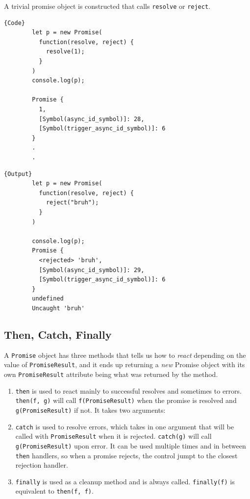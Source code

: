\documentclass{article}
\newcounter{example}[section]
\begin{document}
    \begin{example}
      \label{ex:resolve-without-asynchronous-functions}
      A trivial promise object is constructed that calls \texttt{resolve} or \texttt{reject}. 

      \noindent\begin{minipage}{.5\textwidth}
      \begin{lstlisting}[]{Code}
        let p = new Promise(
          function(resolve, reject) {
            resolve(1); 
          }
        )
        console.log(p); 

        Promise {
          1,
          [Symbol(async_id_symbol)]: 28,
          [Symbol(trigger_async_id_symbol)]: 6
        }
        .
        .
      \end{lstlisting}
      \end{minipage}
      \hfill
      \begin{minipage}{.49\textwidth}
      \begin{lstlisting}[]{Output}
        let p = new Promise(
          function(resolve, reject) {
            reject("bruh"); 
          }
        )

        console.log(p); 
        Promise {
          <rejected> 'bruh',
          [Symbol(async_id_symbol)]: 29,
          [Symbol(trigger_async_id_symbol)]: 6
        }
        undefined
        Uncaught 'bruh'
      \end{lstlisting}
      \end{minipage}
    \end{example}

  \subsection{Then, Catch, Finally}

    A \texttt{Promise} object has three methods that tells us how to \textit{react} depending on the value of \texttt{PromiseResult}, and it ends up returning a \textit{new} Promise object with its own \texttt{PromiseResult} attribute being what was returned by the method. 
    \begin{enumerate}
      \item \texttt{then} is used to react mainly to successful resolves and sometimes to errors. \texttt{then(f, g)} will call \texttt{f(PromiseResult)} when the promise is resolved and \texttt{g(PromiseResult)} if not. 
        It takes two arguments: 

      \item \texttt{catch} is used to resolve errors, which takes in one argument that will be called with \texttt{PromiseResult} when it is rejected. \texttt{catch(g)} will call \texttt{g(PromiseResult)} upon error. It can be used multiple times and in between \texttt{then} handlers, so when a promise rejects, the control jumpt to the closest rejection handler. 

      \item \texttt{finally} is used as a cleanup method and is always called. \texttt{finally(f)} is equivalent to \texttt{then(f, f)}.  
    \end{enumerate}
\end{document}
